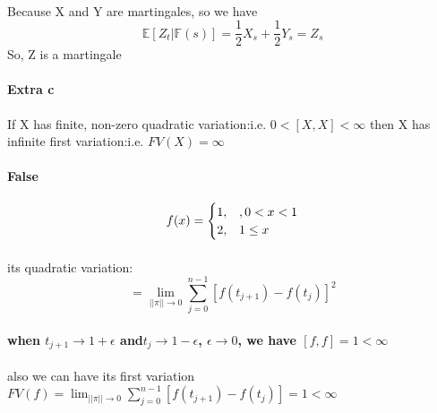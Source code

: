 \documentclass{article}
\begin{document}
\paragraph{}{Because X and Y are martingales, so we have
\begin{displaymath}
   \mathbb{E}[Z_{t}|\mathbb{F}(s)]=\frac{1}{2}X_{s}+\frac{1}{2}Y_{s}=Z_{s}
\end{displaymath} So, Z is a martingale}
\paragraph{Extra c}{If X has finite, non-zero quadratic variation:i.e. $0<[X,X]<\infty$ then X has infinite first variation:i.e. $FV(X)=\infty$}
\paragraph{False}{}
\begin{displaymath}
  f(x)=
\begin{cases}
1, &,0<x<1\cr 2, &1\le x \end{cases}
\end{displaymath}
\paragraph{}{its quadratic variation:}
\begin{displaymath}
  [f,f]=\lim_{||\pi|| \to 0}\sum_{j=0}^{n-1}[f(t_{j+1})-f(t_{j})]^{2}
\end{displaymath}
\paragraph{when $t_{j+1} \to 1+\epsilon$ and$t_{j} \to 1-\epsilon$, $\epsilon \to 0$, we have $[f,f]=1<\infty$   }
\paragraph{}{also we can have its first variation $FV(f)=\lim_{||\pi|| \to 0}\sum_{j=0}^{n-1}[f(t_{j+1})-f(t_{j})]=1<\infty$}
\end{document}
